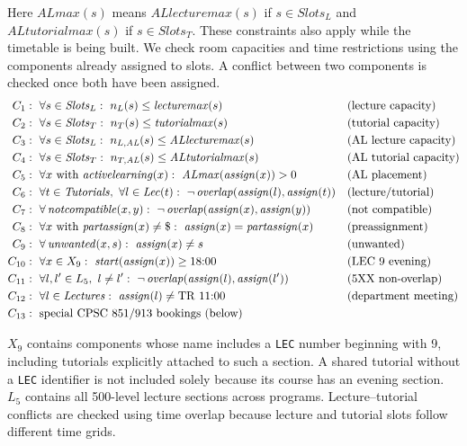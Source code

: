 Here $\mathit{ALmax}(s)$ means $\mathit{ALlecturemax}(s)$ if $s \in \mathit{Slots}_L$ and $\mathit{ALtutorialmax}(s)$ if $s \in \mathit{Slots}_T$. These constraints also apply while the timetable is being built.
We check room capacities and time restrictions using the components
already assigned to slots. A conflict between two components is
checked once both have been assigned.
\begin{align}
C_1 &:\ \forall s \in \mathit{Slots}_L:\ n_L(s) \le \mathit{lecturemax}(s) && \text{(lecture capacity)}\\
C_2 &:\ \forall s \in \mathit{Slots}_T:\ n_T(s) \le \mathit{tutorialmax}(s) && \text{(tutorial capacity)}\\
C_3 &:\ \forall s \in \mathit{Slots}_L:\ n_{L,\mathit{AL}}(s) \le \mathit{ALlecturemax}(s) && \text{(AL lecture capacity)}\\
C_4 &:\ \forall s \in \mathit{Slots}_T:\ n_{T,\mathit{AL}}(s) \le \mathit{ALtutorialmax}(s) && \text{(AL tutorial capacity)}\\
C_5 &:\ \forall x \text{ with } \mathit{activelearning}(x):\ \mathit{ALmax}(\mathit{assign}(x)) > 0 && \text{(AL placement)}\\
C_6 &:\ \forall t \in \mathit{Tutorials},\ \forall l \in \mathit{Lec}(t):\ \neg\,\mathit{overlap}(\mathit{assign}(l), \mathit{assign}(t)) && \text{(lecture/tutorial)}\\
C_7 &:\ \forall\, \mathit{notcompatible}(x,y):\ \neg\,\mathit{overlap}(\mathit{assign}(x), \mathit{assign}(y)) && \text{(not compatible)}\\
C_8 &:\ \forall x \text{ with } \mathit{partassign}(x) \neq \$:\ \mathit{assign}(x) = \mathit{partassign}(x) && \text{(preassignment)}\\
C_9 &:\ \forall\, \mathit{unwanted}(x,s):\ \mathit{assign}(x) \neq s && \text{(unwanted)}\\
C_{10} &:\ \forall x \in X_9:\ \mathit{start}(\mathit{assign}(x)) \ge 18{:}00 && \text{(LEC 9 evening)}\\
C_{11} &:\ \forall l,l'\in L_5,\ l\neq l':
\ \neg\,\mathit{overlap}(\mathit{assign}(l),\mathit{assign}(l'))
&& \text{(5XX non-overlap)}\\
C_{12} &:\ \forall l\in\mathit{Lectures}:
\ \mathit{assign}(l)\neq \mathrm{TR}\ 11{:}00
&& \text{(department meeting)}\\
C_{13} &:\ \text{special CPSC 851/913 bookings (below)} && \notag
\end{align}

$X_9$ contains components whose name includes a \texttt{LEC}
number beginning with 9, including tutorials explicitly attached
to such a section. A shared tutorial without a \texttt{LEC}
identifier is not included solely because its course has an
evening section. $L_5$ contains all 500-level lecture sections
across programs. Lecture--tutorial conflicts are checked using
time overlap because lecture and tutorial slots follow
different time grids.


